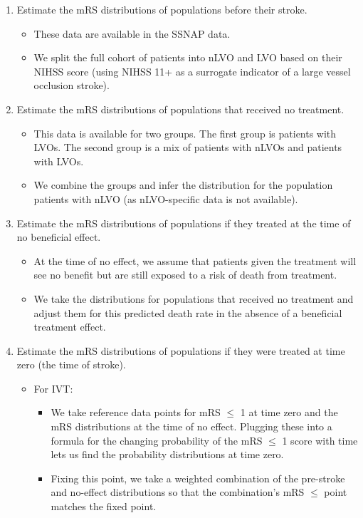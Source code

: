 \begin{enumerate}
    \item Estimate the mRS distributions of populations before their stroke.
    \begin{itemize}
        \item These data are available in the SSNAP data.
        \item We split the full cohort of patients into nLVO and LVO based on their NIHSS score (using NIHSS 11+ as a surrogate indicator of a large vessel occlusion stroke).
    \end{itemize}
     \item Estimate the mRS distributions of populations that received no treatment.
    \begin{itemize}
        \item This data is available for two groups. The first group is patients with LVOs. The second group is a mix of patients with nLVOs and patients with LVOs.
        \item We combine the groups and infer the distribution for the population patients with nLVO (as nLVO-specific data is not available).
    \end{itemize}
        \item Estimate the mRS distributions of populations if they treated at the time of no beneficial effect.
    \begin{itemize}
        \item At the time of no effect, we assume that patients given the treatment will see no benefit but are still exposed to a risk of death from treatment.
    \item We take the distributions for populations that received no treatment and adjust them for this predicted death rate in the absence of a beneficial treatment effect.
    \end{itemize}
    \item Estimate the mRS distributions of populations if they were treated at time zero (the time of stroke).
    \begin{itemize}
        \item For IVT:
        \begin{itemize}
            \item We take reference data points for mRS $\leq$ 1 at time zero and the mRS distributions at the time of no effect. Plugging these into a formula for the changing probability of the mRS $\leq$ 1 score with time lets us find the probability distributions at time zero.
            \item Fixing this point, we take a weighted combination of the pre-stroke and no-effect distributions so that the combination's mRS $\leq$ point matches the fixed point.

\end{itemize}
\end{itemize}
\end{enumerate}
